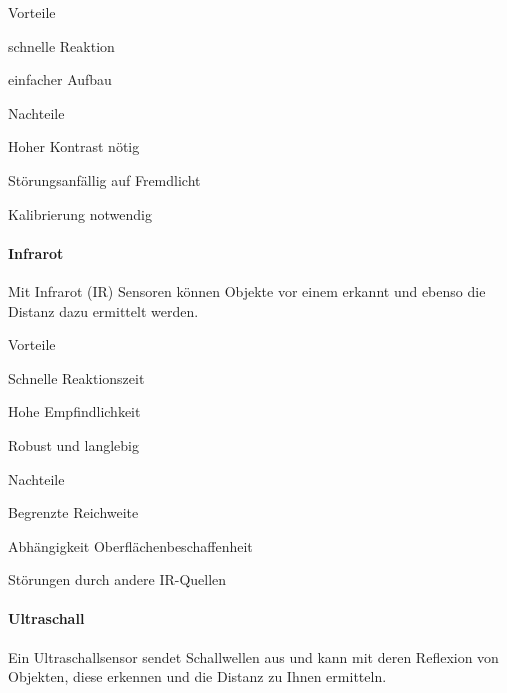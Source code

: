 \begin{minipage}[t]{0.48\textwidth}
\begin{items}
  \item [Vorteile]
  \item schnelle Reaktion
  \item einfacher Aufbau
\end{items}
\end{minipage}
\hfill
\begin{minipage}[t]{0.48\textwidth}
\begin{items}
  \item [Nachteile]
  \item Hoher Kontrast nötig
  \item Störungsanfällig auf Fremdlicht
  \item Kalibrierung notwendig
\end{items}
\end{minipage}

\paragraph{Infrarot}
Mit Infrarot (IR) Sensoren können Objekte vor einem erkannt und ebenso die Distanz dazu ermittelt werden.

\begin{minipage}[t]{0.48\textwidth}
\begin{items}
  \item [Vorteile]
  \item Schnelle Reaktionszeit
  \item Hohe Empfindlichkeit
  \item Robust und langlebig
\end{items}
\end{minipage}
\hfill
\begin{minipage}[t]{0.48\textwidth}
\begin{items}
  \item [Nachteile]
  \item Begrenzte Reichweite
  \item Abhängigkeit Oberflächenbeschaffenheit
  \item Störungen durch andere IR-Quellen
\end{items}
\end{minipage}

\paragraph{Ultraschall}
Ein Ultraschallsensor sendet Schallwellen aus und kann mit deren Reflexion von Objekten, diese erkennen und die Distanz zu Ihnen ermitteln.

